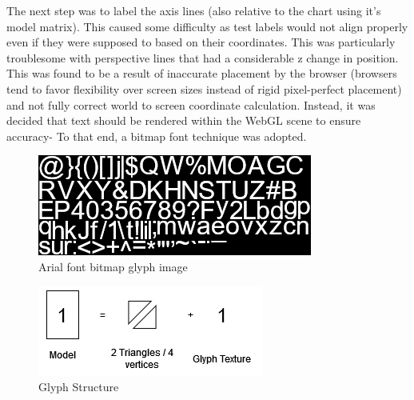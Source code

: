 The next step was to label the axis lines (also relative to the chart using it's model matrix). This caused some difficulty as test labels would not align properly even if they were supposed to based on their coordinates. This was particularly troublesome with perspective lines that had a considerable z change in position. This was found to be a result of inaccurate placement by the browser (browsers tend to favor flexibility over screen sizes instead of rigid pixel-perfect placement) and not fully correct world to screen coordinate calculation. Instead, it was decided that text should be rendered within the WebGL scene to ensure accuracy- To that end, a bitmap font technique was adopted.

\begin{figure}[h]
    \centering
    \includegraphics[width=0.5\columnwidth]{author-files/figures/glyphset.png}
    \caption{Arial font bitmap glyph image}
    \label{fig:arial}
\end{figure}

\begin{figure}[h]
    \centering
    \includegraphics[width=0.5\columnwidth]{author-files/figures/glyphstruct.png}
    \caption{Glyph Structure}
    \label{fig:glyphstruct}
\end{figure}


